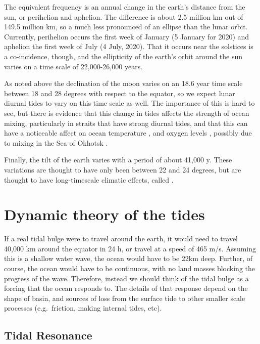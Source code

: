 The equivalent frequency is an annual change in the earth's distance from the sun, or perihelion and aphelion.  The difference is about 2.5 million km out of 149.5 million km, so a much less pronounced of an ellipse than the lunar orbit.  Currently, perihelion occurs the first week of January (5 January for 2020) and aphelion the first week of July (4 July, 2020).    That it occurs near the solstices is a co-incidence, though, and the ellipticity of the earth's orbit around the sun varies on a time scale of 22,000-26,000 years.  

As noted above the declination of the moon varies on an 18.6 year time scale  between 18 and 28 degrees with respect to the equator, so we expect lunar diurnal tides to vary on this time scale as well.  The importance of this is hard to see, but there is evidence that this change in tides affects the strength of ocean mixing, particularly in straits that have strong diurnal tides, and that this can have a noticeable affect on ocean temperature \citep{mckinnellcrawford07}, and oxygen levels \citep{crawfordpena16}, possibly due to mixing in the Sea of Okhotsk \citep{yasudaetal06}.

Finally, the tilt of the earth varies with a period of about 41,000 y.  These variations are thought to have only been between 22 and 24 degrees, but are thought to have long-timescale climatic effects, called .  

\section{Dynamic theory of the tides}

If a real tidal bulge were to travel around the earth, it would need to travel 40,000 km around the equator in 24 h, or travel at a speed of 465 m/s.  Assuming this is a shallow water wave, the ocean would have to be 22km deep.  Further, of course, the ocean would have to be continuous, with no land masses blocking the progress of the wave.  Therefore, instead we should think of the tidal bulge as a forcing that the ocean responds to.  The details of that response depend on the shape of basin, and sources of loss from the surface tide to other smaller scale processes (e.g.\ friction, making internal tides, etc).  

\subsection{Tidal Resonance}

